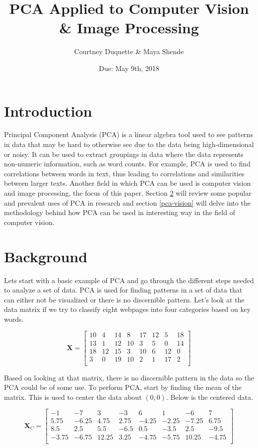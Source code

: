 \documentclass[11pt]{article}
\title{PCA Applied to Computer Vision \& Image Processing}
\author{Courtney Duquette \& Maya Shende}
\date{Due: May 9th, 2018}
\begin{document}
\maketitle

\section{Introduction} \label{introduction}
Principal Component Analysis (PCA) is a linear algebra tool used to see patterns in data that may be hard to otherwise see due to the data being high-dimensional or noisy. It can be used to extract groupings in data where the data represents non-numeric information, such as word counts. For example, PCA is used to find correlations between words in text, thus leading to correlations and similarities between larger texts. Another field in which PCA can be used is computer vision and image processing, the focus of this paper. Section \ref{background} will review some popular and prevalent uses of PCA in research and section \ref{pca-vision} will delve into the methodology behind how PCA can be used in interesting way in the field of computer vision. 

\section{Background} \label{background}
Lets start with a basic example of PCA and go through the different steps needed to analyze a set of data. PCA is used for finding patterns in a set of data that can either not be visualized or there is no discernible pattern. Let's look at the data matrix if we try to classify eight webpages into four categories based on key words. 

$$
\textbf{X} = 
\begin{bmatrix} 
10 &  4 & 14 &  8 & 17 & 12 &  5 & 18 \\
		13 &  1 & 12 & 10 &  3 &  5 &  0 & 14 \\	
  	        18 & 12 & 15 &  3 & 10 &  6 & 12 &  0 \\	
		 3 &  0 & 19 & 10 &  2 &  1 & 17 &  2 \\
\end{bmatrix}
$$
	
Based on looking at that matrix, there is no discernible pattern in the data so the PCA could be of some use. To perform PCA, start by finding the mean of the matrix. This is used to center the data about $(0,0)$. Below is the centered data.
 
$$
\textbf{X}_{C} = 
\begin{bmatrix} -1 & -7 &  3 & -3 &  6 &  1 & -6 &  7 \\
		5.75 & -6.25 & 4.75 & 2.75 & -4.25 & -2.25 & -7.25 & 6.75 \\	
  	        8.5 & 2.5 & 5.5 & -6.5 & 0.5 & -3.5 & 2.5 & -9.5 \\	
		-3.75 & -6.75 & 12.25 & 3.25 & -4.75 & -5.75 & 10.25 & -4.75 \\
\end{bmatrix}
$$
\end{document}

